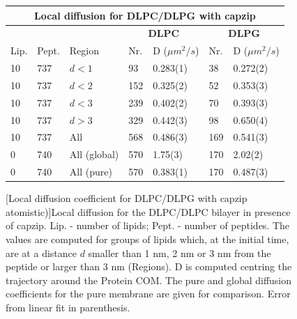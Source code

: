 %
\begin{figure}[p!]
\centering
 \def\arraystretch{1.6}
\begin{tabular}{lllllll}
\multicolumn{7}{c}{\textbf{Local diffusion for DLPC/DLPG with capzip}} \\
\hline
& & & \multicolumn{2}{c}{\textbf{DLPC}} & \multicolumn{2}{c}{\textbf{DLPG}} \\
 \hline
Lip. & Pept. & Region & Nr. & D ($\mu m^2/s$) & Nr. & D ($\mu m^2/s$) \\
 \hline
10 & 737 & $d<1$ & 93 & 0.283(1) & 38 & 0.272(2)  \\
10 & 737 & $d<2$ & 152 & 0.325(2) & 52 & 0.353(3) \\
10 & 737 & $d<3$ & 239 & 0.402(2) & 70 & 0.393(3) \\
10 & 737 & $d>3$ & 329 & 0.442(3) & 98 & 0.650(4) \\
10 & 737 & All & 568 & 0.486(3) & 169 & 0.541(3) \\
 \hline
0 & 740 & All (global) & 570 & 1.75(3) & 170 & 2.02(2) \\
0 & 740 & All (pure) & 570 & 0.383(1) & 170 & 0.487(3) \\
 \hline
 \end{tabular}
[Local diffusion coefficient for DLPC/DLPG with capzip atomistic)]{Local diffusion for the DLPC/DLPC bilayer in presence of capzip. 
%
Lip. - number of lipids; Pept. - number of peptides.
%
The values are computed for groups of lipids which, at the initial time, are at a distance $d$ smaller than 1 nm, 2 nm or 3 nm from the peptide or larger than 3 nm (Regions).
%
D is computed centring the trajectory around the Protein COM. The pure and global diffusion coefficients for the pure membrane are given for comparison. Error from linear fit in parenthesis.}
\label{table:D_space}

\vspace{0.5cm}


\end{figure}
